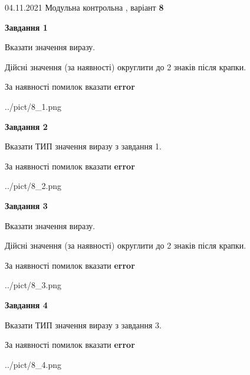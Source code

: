 \documentclass[11pt, ukrainian]{article}
\begin{document}
{04.11.2021 Модульна контрольна , варіант  \No \textbf { 8 }\par}
{
\begin {large}
{\begin {center}\textbf{Завдання 1}\end {center}}\par
Вказати значення виразу. \par
Дійсні значення (за наявності) округлити до 2 знаків після крапки. \par
За наявності помилок вказати \textbf{error}

\begin{center}
	{../pict/8_1.png}
\end{center}
\newpage

{\begin {center}\textbf{Завдання 2}\end {center}}\par
Вказати ТИП значення виразу з завдання 1. \par
За наявності помилок вказати \textbf{error}

\begin{center}
	{../pict/8_2.png}
\end{center}
\newpage

{\begin {center}\textbf{Завдання 3}\end {center}}\par
Вказати значення виразу. \par
Дійсні значення (за наявності) округлити до 2 знаків після крапки. \par
За наявності помилок вказати \textbf{error}

\begin{center}
	{../pict/8_3.png}
\end{center}
\newpage

{\begin {center}\textbf{Завдання 4}\end {center}}\par
Вказати ТИП значення виразу з завдання 3. \par
За наявності помилок вказати \textbf{error}

\begin{center}
	{../pict/8_4.png}
\end{center}
\newpage


\end{large}}
\end{document}
